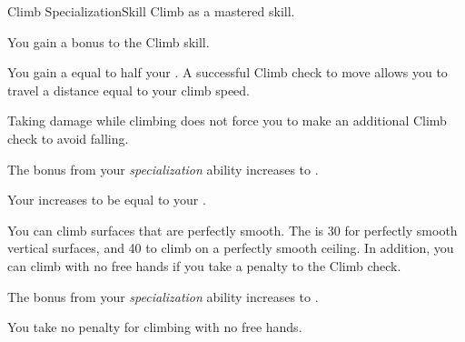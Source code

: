     \begin{feat}{Climb Specialization}{Skill}
        \featpre Climb as a mastered skill.

         You gain a  bonus to the Climb skill.

         You gain a  equal to half your .
        A successful Climb check to move allows you to travel a distance equal to your climb speed.

         Taking damage while climbing does not force you to make an additional Climb check to avoid falling.

         The bonus from your \textit{specialization} ability increases to .

         Your  increases to be equal to your .

         You can climb surfaces that are perfectly smooth.
        The  is 30 for perfectly smooth vertical surfaces, and 40 to climb on a perfectly smooth ceiling.
        In addition, you can climb with no free hands if you take a  penalty to the Climb check.

         The bonus from your \textit{specialization} ability increases to .

         You take no penalty for climbing with no free hands.
    \end{feat}


